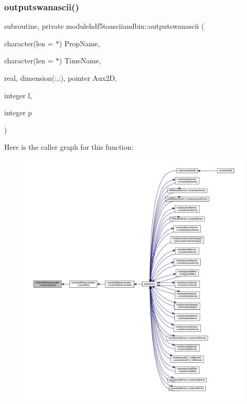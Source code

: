 \subsubsection{\texorpdfstring{outputswanascii()}{outputswanascii()}}
{\footnotesize\ttfamily subroutine, private modulehdf5toasciiandbin\+::outputswanascii (\begin{DoxyParamCaption}\item[{character(len = $\ast$)}]{Prop\+Name,  }\item[{character(len = $\ast$)}]{Time\+Name,  }\item[{real, dimension(\+:,\+:), pointer}]{Aux2D,  }\item[{integer}]{l,  }\item[{integer}]{p }\end{DoxyParamCaption})\hspace{0.3cm}{\ttfamily [private]}}

Here is the caller graph for this function\+:\nopagebreak
\begin{figure}[H]
\begin{center}
\leavevmode
\includegraphics[width=350pt]{namespacemodulehdf5toasciiandbin_ad9bbff03f3e4066dec1d8a161e2d0be4_icgraph}
\end{center}
\end{figure}
\mbox{\label{namespacemodulehdf5toasciiandbin_a1065af2accb4bf167b115af350e3c406}} 
